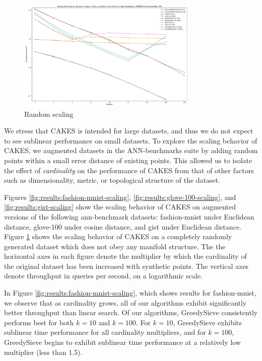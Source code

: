 \begin{figure}[ht!]
    \centering
    \includegraphics[width=3.4in]{images/result_plots/random_0.1_scaling.png}
    \caption{
        Random scaling
    }
    \label{fig:results:random-scaling}
\end{figure}

We stress that CAKES is intended for large datasets, and thus we do not expect to see sublinear performance on small datasets. 
To explore the scaling behavior of CAKES, we augmented datasets in the ANN-benchmarks suite by adding random points within a 
small error distance of existing points. This allowed us to isolate the effect of \emph{cardinality} on the performance of CAKES 
from that of other factors such as dimensionality, metric, or topological structure of the dataset. 


Figures \ref{fig:results:fashion-mnist-scaling}, \ref{fig:results:glove-100-scaling}, and \ref{fig:results:gist-scaling} show the scaling behavior of CAKES on augmented versions of the following ann-benchmark datasets: fashion-mnist under Euclidean distance, glove-100 under cosine distance, and gist under Euclidean distance. 
Figure \ref{fig:results:random-scaling} shows the scaling behavior of CAKES on a completely randomly generated dataset which does not obey any manifold structure. 
The the horizontal axes in each figure denote the multiplier by which the cardinality of the original dataset has been increased with synthetic points. The vertical axes denote throughput in queries per second, on a logarithmic scale. 


In Figure \ref{fig:results:fashion-mnist-scaling}, which shows results for fashion-mnist, we observe that as cardinality grows, all of our algorithms exhibit significantly better throughput than linear search. 
Of our algorithms, GreedySieve consistently performs best for both $k=10$ and $k=100$. For $k=10$, GreedySieve exhibits sublinear time performance for all cardinality multipliers, and for $k = 100$, GreedySieve begins to exhibit sublinear time performance at a relatively low multiplier (less than 1.5).  


